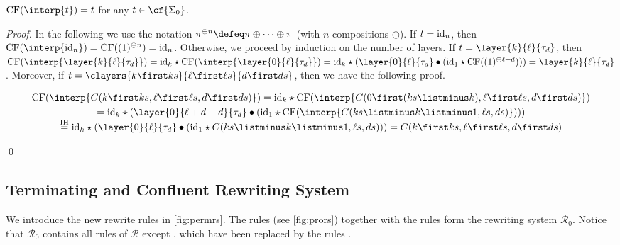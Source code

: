 \begin{lemma}\label{lem:cfcfterm}
    $\textup{CF}(\interp{t})=t$ for any $t\in \cf{\Sigma_0}$.
\end{lemma}
\begin{proof}
    In the following we use the notation $\pi^{\oplus n}\defeq \pi\oplus\dots\oplus\pi$ (with $n$ compositions $\oplus$). 
    If $t=\textup{id}_n$, then $\textup{CF}(\interp{\textup{id}_n})=\textup{CF}((1)^{\oplus n})=\textup{id}_n$. Otherwise, we proceed by induction on the number of layers. If $t=\layer{k}{\ell}{\tau_d}$, then $\textup{CF}(\interp{\layer{k}{\ell}{\tau_d}})=\textup{id}_k\star\textup{CF}(\interp{\layer{0}{\ell}{\tau_d}})=\textup{id}_k\star(\layer{0}{\ell}{\tau_d}\bullet(\textup{id}_1\star\textup{CF}((1)^{\oplus \ell+d})))=\layer{k}{\ell}{\tau_d}$. Moreover, if $t=\clayers{k\first ks}{\ell\first \ell s}{d\first ds}$, then we have the following proof.
    \begin{minipage}[b]{0.95\linewidth}
    \begin{gather*}
        \textup{CF}(\interp{C(k\first ks,\ell\first \ell s,d\first ds)})
        =\textup{id}_k\star\textup{CF}(\interp{C(0\first (ks\listminus k),\ell\first \ell s,d\first ds)}) \\
        =\textup{id}_k\star(\layer{0}{\ell+d-d}{\tau_d}\bullet(\textup{id}_1\star\textup{CF}(\interp{C(ks\listminus k\listminus 1,\ell s,ds)}))) \\[-0.4em]
        \overset{\textup{IH}}{=}\textup{id}_k\star(\layer{0}{\ell}{\tau_d}\bullet (\textup{id}_1\star C(ks\listminus k\listminus 1,\ell s,ds))) 
        =C(k\first ks,\ell\first \ell s,d\first ds)
    \end{gather*}
\end{minipage}%
\begin{minipage}[b]{0.05\linewidth}
    \qed
\end{minipage}
\end{proof}


\subsection{Terminating and Confluent Rewriting System}

We introduce the new rewrite rules in \cref{fig:permrs}. The rules  (see \cref{fig:prors}) together with the rules  form the rewriting system $\mathcal{R}_0$. Notice that $\mathcal{R}_0$ contains all rules of $\mathcal{R}$ except , which have been replaced by the rules . 

